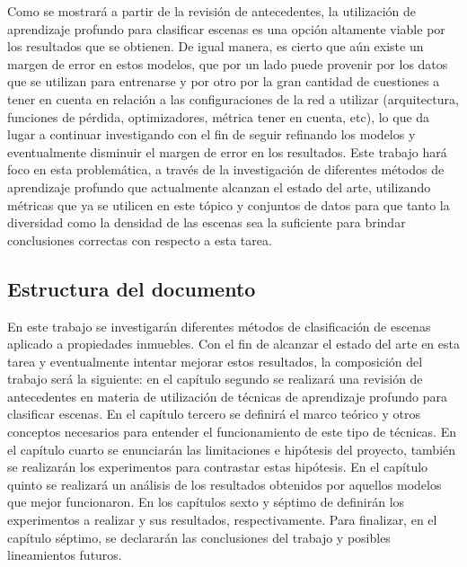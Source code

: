 Como se mostrará a partir de la revisión de antecedentes, la utilización de aprendizaje profundo para clasificar escenas es una opción altamente viable por los resultados que se obtienen. De igual manera, es cierto que aún existe un margen de error en estos modelos, que por un lado puede provenir por los datos que se utilizan para entrenarse y por otro por la gran cantidad de cuestiones a tener en cuenta en relación a las configuraciones de la red a utilizar (arquitectura, funciones de pérdida, optimizadores, métrica tener en cuenta, etc), lo que da lugar a continuar investigando con el fin de seguir refinando los modelos y eventualmente disminuir el margen de error en los resultados. Este trabajo hará foco en esta problemática, a través de la investigación de diferentes métodos de aprendizaje profundo que actualmente alcanzan el estado del arte, utilizando métricas que ya se utilicen en este tópico y conjuntos de datos para que tanto la diversidad como la densidad de las escenas sea la suficiente para brindar conclusiones correctas con respecto a esta tarea.


\subsection{Estructura del documento}
En este trabajo se investigarán diferentes métodos de clasificación de escenas aplicado a propiedades inmuebles. Con el fin de alcanzar el estado del arte en esta tarea y eventualmente intentar mejorar estos resultados, la composición del trabajo será la siguiente: en el capítulo segundo se realizará una revisión de antecedentes en materia de utilización de técnicas de aprendizaje profundo para clasificar escenas. En el capítulo tercero se definirá el marco teórico y otros conceptos necesarios para entender el funcionamiento de este tipo de técnicas. En el capítulo cuarto se enunciarán las limitaciones e hipótesis del proyecto, también se realizarán los experimentos para contrastar estas hipótesis. En el capítulo quinto se realizará un análisis de los resultados obtenidos por aquellos modelos que mejor funcionaron. En los capítulos sexto y séptimo de definirán los experimentos a realizar y sus resultados, respectivamente. Para finalizar, en el capítulo séptimo, se declararán las conclusiones del trabajo y posibles lineamientos futuros.